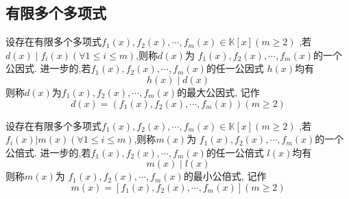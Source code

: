 \subsection{有限多个多项式}
\begin{formal}
\begin{definition}[有限多个多项式的公因式与最大公因式定义]\label{def:有限多个多项式的公因式与最大公因式定义}
    设存在有限多个多项式$f_1\left(x\right),f_2\left(x\right),\cdots,f_m\left(x\right)\in\mathbb{K}\left[x\right]\left(m\geqslant 2\right)$
,若$d\left(x\right)\mid f_i\left(x\right)\left(\forall 1\leqslant i\leqslant m\right)$,则称$d\left(x\right)$为
$f_1\left(x\right),f_2\left(x\right),\cdots,f_m\left(x\right)$的一个公因式.
进一步的,若$f_1\left(x\right),f_2\left(x\right),\cdots,f_m\left(x\right)$的任一公因式
$h\left(x\right)$均有
\[
h\left(x\right)\mid d\left(x\right)
\]
则称$d\left(x\right)$为$f_1\left(x\right),f_2\left(x\right),\cdots,f_m\left(x\right)$的最大公因式,
记作\[
d\left(x\right)=\left(
    f_1\left(x\right),f_2\left(x\right),\cdots,f_m\left(x\right)
\right)\left(m\geqslant 2\right)
\]
\end{definition}
\end{formal}
\begin{formal}
\begin{definition}[有限多个多项式的公倍式与最小公倍式定义]\label{def:有限多个多项式的公倍式与最小公倍式定义}
    设存在有限多个多项式$f_1\left(x\right),f_2\left(x\right),\cdots,f_m\left(x\right)\in\mathbb{K}\left[x\right]\left(m\geqslant 2\right)$
,若$f_i\left(x\right)|m\left(x\right)\left(\forall 1\leqslant i\leqslant m\right)$,则称$m\left(x\right)$为
$f_1\left(x\right),f_2\left(x\right),\cdots,f_m\left(x\right)$的一个公倍式.
进一步的,若$f_1\left(x\right),f_2\left(x\right),\cdots,f_m\left(x\right)$的任一公倍式
$l\left(x\right)$均有
\[
m\left(x\right)\mid l\left(x\right)
\]
则称$m\left(x\right)$为
$f_1\left(x\right),f_2\left(x\right),\cdots,f_m\left(x\right)$的最小公倍式,
记作\[
m\left(x\right)=\left[
    f_1\left(x\right),f_2\left(x\right),\cdots,f_m\left(x\right)
\right]\left(m\geqslant 2\right)
\]
\end{definition}
\end{formal}
